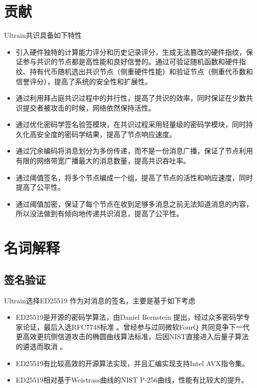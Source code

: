 \documentclass[12pt, UTF8]{article}
\begin{document}
\section{贡献}
Ultrain共识具备如下特性
\begin{itemize}
\item 引入硬件独特的计算能力评分和历史记录评分，生成无法篡改的硬件指纹，保证参与共识的节点都是高性能和良好信誉的。通过可验证随机函数和硬件指纹、持有代币随机选出共识节点（侧重硬件性能）和验证节点（侧重代币数和信誉评分），提高了系统的安全性和扩展性。%
\item 通过利用拜占庭共识过程中的并行性，提高了共识的效率，同时保证在少数共识提交者被攻击的时候，网络依然保持活性。
\item 通过优化密码学签名验签模块，在共识过程采用轻量级的密码学模块\cite{bogdanov2011spongent, aumasson2010quark}，同时持久化高安全度的密码学结果，提高了节点响应速度。
\item 通过冗余编码\cite{wang2005erasure}将消息划分为多份传递，而不是一份消息广播，保证了节点利用有限的网络带宽广播最大的消息数量，提高共识吞吐率。
\item 通过阈值签名\cite{boldyreva2003threshold}，将多个节点编成一个组，提高了节点的活性和响应速度，同时提高了公平性。
\item 通过阈值加密\cite{boneh2006chosen}，保证了每个节点在收到足够多消息之前无法知道消息的内容，所以没法做到有倾向地传递共识消息，提高了公平性。
\end{itemize}

\section{名词解释}
\subsection{签名验证}
Ultrain选择ED25519\cite{bernstein2012high} 作为对消息的签名，主要是基于如下考虑
\begin{itemize}
\item ED25519是开源的密码学算法，由Daniel Bernstein 提出，经过众多密码学专家论证，最后入选RFC7748标准 。曾经参与过同微软FourQ\cite{longafour} 共同竞争下一代更高效更抗侧信道攻击的椭圆曲线算法标准，后因NIST直接进入后量子算法的遴选而取消 。
\item ED25519有比较高效的开源算法实现，并且汇编实现支持Intel AVX指令集。
\item ED25519相对基于Weistrass曲线的NIST P-256曲线，性能有比较大的提升。
\end{itemize}
\end{document}
